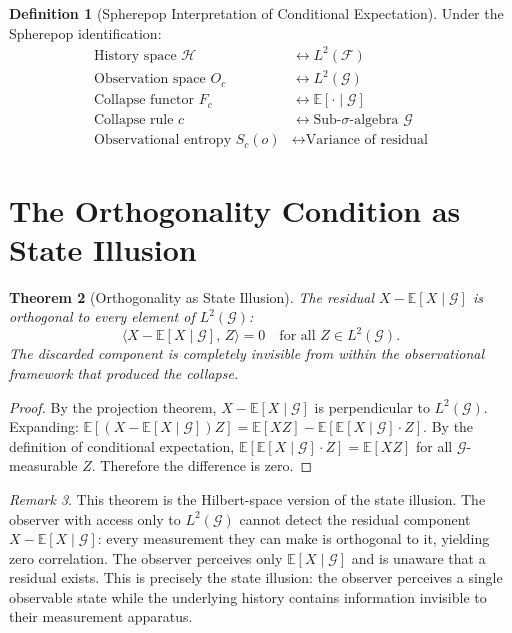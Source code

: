 \documentclass[12pt, a4paper, openany]{book}
\theoremstyle{plain}
\newtheorem{theorem}{Theorem}[chapter]
\theoremstyle{definition}
\newtheorem{definition}[theorem]{Definition}
\theoremstyle{remark}
\newtheorem{remark}[theorem]{Remark}
\newcommand{\calH}{\mathcal{H}}
\begin{document}
\begin{definition}[Spherepop Interpretation of Conditional Expectation]
Under the Spherepop identification:
\begin{align*}
\text{History space } \calH &\longleftrightarrow L^2(\mathcal{F}) \\
\text{Observation space } O_c &\longleftrightarrow L^2(\mathcal{G}) \\
\text{Collapse functor } F_c &\longleftrightarrow \mathbb{E}[\cdot \mid \mathcal{G}] \\
\text{Collapse rule } c &\longleftrightarrow \text{Sub-}\sigma\text{-algebra } \mathcal{G} \\
\text{Observational entropy } S_c(o) &\longleftrightarrow \text{Variance of residual}
\end{align*}
\end{definition}

\section{The Orthogonality Condition as State Illusion}

\begin{theorem}[Orthogonality as State Illusion]
The residual $X - \mathbb{E}[X \mid \mathcal{G}]$ is orthogonal to every element
of $L^2(\mathcal{G})$:
\[
\bigl\langle X - \mathbb{E}[X \mid \mathcal{G}],\, Z \bigr\rangle = 0
\quad \text{for all } Z \in L^2(\mathcal{G}).
\]
The discarded component is completely invisible from within the observational
framework that produced the collapse.
\end{theorem}

\begin{proof}
By the projection theorem, $X - \mathbb{E}[X \mid \mathcal{G}]$ is perpendicular
to $L^2(\mathcal{G})$. Expanding: $\mathbb{E}[(X - \mathbb{E}[X\mid\mathcal{G}])Z] =
\mathbb{E}[XZ] - \mathbb{E}[\mathbb{E}[X\mid\mathcal{G}] \cdot Z]$.
By the definition of conditional expectation,
$\mathbb{E}[\mathbb{E}[X\mid\mathcal{G}] \cdot Z] = \mathbb{E}[XZ]$
for all $\mathcal{G}$-measurable $Z$. Therefore the difference is zero.
\end{proof}

\begin{remark}
This theorem is the Hilbert-space version of the state illusion. The observer
with access only to $L^2(\mathcal{G})$ cannot detect the residual component
$X - \mathbb{E}[X\mid\mathcal{G}]$: every measurement they can make is
orthogonal to it, yielding zero correlation. The observer perceives only
$\mathbb{E}[X\mid\mathcal{G}]$ and is unaware that a residual exists. This
is precisely the state illusion: the observer perceives a single observable
state while the underlying history contains information invisible to their
measurement apparatus.
\end{remark}
\end{document}
